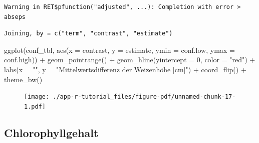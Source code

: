 \documentclass[
  letterpaper,
  DIV=11,
  oneside]{scrreport}
\newenvironment{Shaded}{\begin{snugshade}}{\end{snugshade}}
\newcommand{\AttributeTok}[1]{\textcolor[rgb]{0.40,0.45,0.13}{#1}}
\newcommand{\DecValTok}[1]{\textcolor[rgb]{0.68,0.00,0.00}{#1}}
\newcommand{\FunctionTok}[1]{\textcolor[rgb]{0.28,0.35,0.67}{#1}}
\newcommand{\NormalTok}[1]{\textcolor[rgb]{0.00,0.23,0.31}{#1}}
\newcommand{\SpecialCharTok}[1]{\textcolor[rgb]{0.37,0.37,0.37}{#1}}
\newcommand{\StringTok}[1]{\textcolor[rgb]{0.13,0.47,0.30}{#1}}
\begin{document}
\begin{verbatim}
Warning in RET$pfunction("adjusted", ...): Completion with error > abseps
\end{verbatim}

\begin{verbatim}
Joining, by = c("term", "contrast", "estimate")
\end{verbatim}

\begin{Shaded}
\begin{Highlighting}[]
\FunctionTok{ggplot}\NormalTok{(conf\_tbl, }\FunctionTok{aes}\NormalTok{(}\AttributeTok{x =}\NormalTok{ contrast, }\AttributeTok{y =}\NormalTok{ estimate, }
                     \AttributeTok{ymin =}\NormalTok{ conf.low, }\AttributeTok{ymax =}\NormalTok{ conf.high)) }\SpecialCharTok{+}
  \FunctionTok{geom\_pointrange}\NormalTok{() }\SpecialCharTok{+}
  \FunctionTok{geom\_hline}\NormalTok{(}\AttributeTok{yintercept =} \DecValTok{0}\NormalTok{, }\AttributeTok{color =} \StringTok{"red"}\NormalTok{) }\SpecialCharTok{+}
  \FunctionTok{labs}\NormalTok{(}\AttributeTok{x =} \StringTok{""}\NormalTok{, }\AttributeTok{y =} \StringTok{"Mittelwertsdifferenz der Weizenhöhe [cm]"}\NormalTok{) }\SpecialCharTok{+}
  \FunctionTok{coord\_flip}\NormalTok{() }\SpecialCharTok{+}
  \FunctionTok{theme\_bw}\NormalTok{()}
\end{Highlighting}
\end{Shaded}

\begin{figure}[H]

{\centering \texttt{[image: ./app-r-tutorial\_files/figure-pdf/unnamed-chunk-17-1.pdf]}

}

\end{figure}

\hypertarget{chlorophyllgehalt}{%
\subsection{Chlorophyllgehalt}\label{chlorophyllgehalt}}
\end{document}
